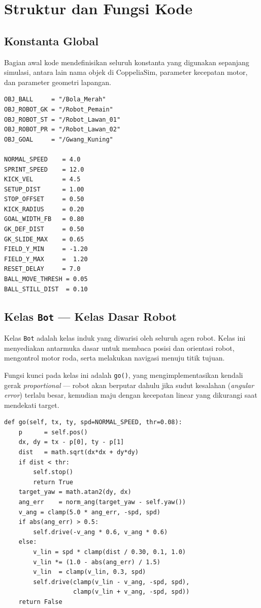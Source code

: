 \documentclass{article}
\begin{document}
\section{Struktur dan Fungsi Kode}

\subsection{Konstanta Global}

Bagian awal kode mendefinisikan seluruh konstanta yang digunakan sepanjang
simulasi, antara lain nama objek di CoppeliaSim, parameter kecepatan motor,
dan parameter geometri lapangan.

\begin{verbatim}
OBJ_BALL     = "/Bola_Merah"
OBJ_ROBOT_GK = "/Robot_Pemain"
OBJ_ROBOT_ST = "/Robot_Lawan_01"
OBJ_ROBOT_PR = "/Robot_Lawan_02"
OBJ_GOAL     = "/Gwang_Kuning"

NORMAL_SPEED    = 4.0
SPRINT_SPEED    = 12.0
KICK_VEL        = 4.5
SETUP_DIST      = 1.00
STOP_OFFSET     = 0.50
KICK_RADIUS     = 0.20
GOAL_WIDTH_FB   = 0.80
GK_DEF_DIST     = 0.50
GK_SLIDE_MAX    = 0.65
FIELD_Y_MIN     = -1.20
FIELD_Y_MAX     =  1.20
RESET_DELAY     = 7.0
BALL_MOVE_THRESH = 0.05
BALL_STILL_DIST  = 0.10
\end{verbatim}

\subsection{Kelas \texttt{Bot} — Kelas Dasar Robot}

Kelas \texttt{Bot} adalah kelas induk yang diwarisi oleh seluruh agen robot.
Kelas ini menyediakan antarmuka dasar untuk membaca posisi dan orientasi robot,
mengontrol motor roda, serta melakukan navigasi menuju titik tujuan.

Fungsi kunci pada kelas ini adalah \texttt{go()}, yang mengimplementasikan
kendali gerak \textit{proportional} — robot akan berputar dahulu jika sudut
kesalahan (\textit{angular error}) terlalu besar, kemudian maju dengan kecepatan
linear yang dikurangi saat mendekati target.

\begin{verbatim}
def go(self, tx, ty, spd=NORMAL_SPEED, thr=0.08):
    p      = self.pos()
    dx, dy = tx - p[0], ty - p[1]
    dist   = math.sqrt(dx*dx + dy*dy)
    if dist < thr:
        self.stop()
        return True
    target_yaw = math.atan2(dy, dx)
    ang_err    = norm_ang(target_yaw - self.yaw())
    v_ang = clamp(5.0 * ang_err, -spd, spd)
    if abs(ang_err) > 0.5:
        self.drive(-v_ang * 0.6, v_ang * 0.6)
    else:
        v_lin = spd * clamp(dist / 0.30, 0.1, 1.0)
        v_lin *= (1.0 - abs(ang_err) / 1.5)
        v_lin  = clamp(v_lin, 0.3, spd)
        self.drive(clamp(v_lin - v_ang, -spd, spd),
                   clamp(v_lin + v_ang, -spd, spd))
    return False
\end{verbatim}
\end{document}
